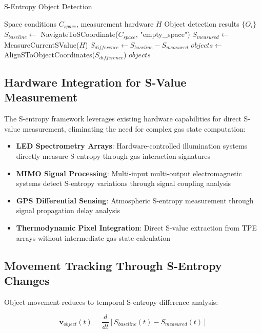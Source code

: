 \documentclass[12pt,a4paper]{article}
\begin{document}
\begin{algorithm}
\caption{S-Entropy Object Detection}
\begin{algorithmic}[1]
\REQUIRE Space conditions $C_{space}$, measurement hardware $H$
\ENSURE Object detection results $\{O_i\}$
\STATE $S_{baseline} \leftarrow$ NavigateToSCoordinate($C_{space}$, "empty\_space")
\STATE $S_{measured} \leftarrow$ MeasureCurrentSValue($H$)
\STATE $S_{difference} \leftarrow S_{baseline} - S_{measured}$
\STATE $objects \leftarrow$ AlignSToObjectCoordinates($S_{difference}$)
\RETURN $objects$
\end{algorithmic}
\end{algorithm}

\subsection{Hardware Integration for S-Value Measurement}

The S-entropy framework leverages existing hardware capabilities for direct S-value measurement, eliminating the need for complex gas state computation:

\begin{itemize}
\item \textbf{LED Spectrometry Arrays}: Hardware-controlled illumination systems directly measure S-entropy through gas interaction signatures
\item \textbf{MIMO Signal Processing}: Multi-input multi-output electromagnetic systems detect S-entropy variations through signal coupling analysis
\item \textbf{GPS Differential Sensing}: Atmospheric S-entropy measurement through signal propagation delay analysis
\item \textbf{Thermodynamic Pixel Integration}: Direct S-value extraction from TPE arrays without intermediate gas state calculation
\end{itemize}

\subsection{Movement Tracking Through S-Entropy Changes}

Object movement reduces to temporal S-entropy difference analysis:

\begin{equation}
\mathbf{v}_{object}(t) = \frac{d}{dt}[S_{baseline}(t) - S_{measured}(t)]
\end{equation}
\end{document}
